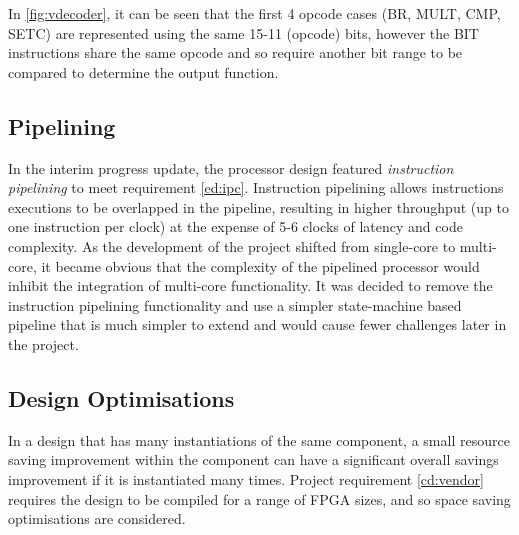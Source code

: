 In \cref{fig:vdecoder}, it can be seen that the first 4 opcode cases (BR, MULT, CMP, SETC) are represented using the same 15-11 (opcode) bits, however the BIT instructions share the same opcode and so require another bit range to be compared to determine the output function.



\subsection{Pipelining}
In the interim progress update, the processor design featured \textit{instruction pipelining} to meet requirement \ref{ed:ipc}. Instruction pipelining allows instructions executions to be overlapped in the pipeline, resulting in higher throughput (up to one instruction per clock) at the expense of 5-6 clocks of latency and code complexity. As the development of the project shifted from single-core to multi-core, it became obvious that the complexity of the pipelined processor would inhibit the integration of multi-core functionality. It was decided to remove the instruction pipelining functionality and use a simpler state-machine based pipeline that is much simpler to extend and would cause fewer challenges later in the project. 

\subsection{Design Optimisations}
In a design that has many instantiations of the same component, a small resource saving improvement within the component can have a significant overall savings improvement if it is instantiated many times. Project requirement \ref{cd:vendor} requires the design to be compiled for a range of FPGA sizes, and so space saving optimisations are considered. 

